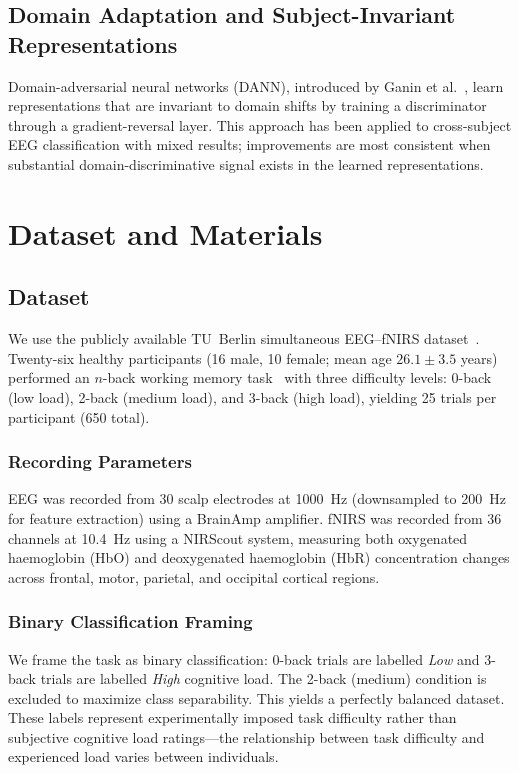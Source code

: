 \documentclass[conference]{IEEEtran}
\begin{document}
\subsection{Domain Adaptation and Subject-Invariant Representations}
Domain-adversarial neural networks (DANN), introduced by Ganin et al.~\cite{ganin2016domain}, learn representations that are invariant to domain shifts by training a discriminator through a gradient-reversal layer. This approach has been applied to cross-subject EEG classification with mixed results; improvements are most consistent when substantial domain-discriminative signal exists in the learned representations.

\section{Dataset and Materials}

\subsection{Dataset}
We use the publicly available TU~Berlin simultaneous EEG--fNIRS dataset~\cite{shin2018simultaneous}. Twenty-six healthy participants (16 male, 10 female; mean age $26.1 \pm 3.5$ years) performed an $n$-back working memory task~\cite{kirchner1958nback, owen2005nback} with three difficulty levels: 0-back (low load), 2-back (medium load), and 3-back (high load), yielding 25 trials per participant (650 total).

\subsubsection{Recording Parameters}
EEG was recorded from 30 scalp electrodes at \SI{1000}{\hertz} (downsampled to \SI{200}{\hertz} for feature extraction) using a BrainAmp amplifier. fNIRS was recorded from 36 channels at \SI{10.4}{\hertz} using a NIRScout system, measuring both oxygenated haemoglobin (HbO) and deoxygenated haemoglobin (HbR) concentration changes across frontal, motor, parietal, and occipital cortical regions.

\subsubsection{Binary Classification Framing}
We frame the task as binary classification: 0-back trials are labelled \textit{Low} and 3-back trials are labelled \textit{High} cognitive load. The 2-back (medium) condition is excluded to maximize class separability. This yields a perfectly balanced dataset. These labels represent experimentally imposed task difficulty rather than subjective cognitive load ratings---the relationship between task difficulty and experienced load varies between individuals.
\end{document}
